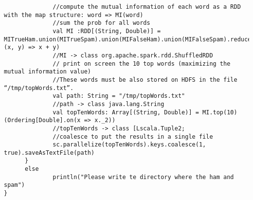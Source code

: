 \documentclass[paper=a4, fontsize=11pt]{scrartcl}
\numberwithin{equation}{section}		%
\numberwithin{figure}{section}			%
\numberwithin{table}{section}				%
\begin{document}
\begin{lstlisting}
              //compute the mutual information of each word as a RDD with the map structure: word => MI(word)
              //sum the prob for all words
              val MI :RDD[(String, Double)] = MITrueHam.union(MITrueSpam).union(MIFalseHam).union(MIFalseSpam).reduceByKey( (x, y) => x + y)
              //MI -> class org.apache.spark.rdd.ShuffledRDD
              // print on screen the 10 top words (maximizing the mutual information value)
              //These words must be also stored on HDFS in the file “/tmp/topWords.txt”.
              val path: String = "/tmp/topWords.txt"
              //path -> class java.lang.String
              val topTenWords: Array[(String, Double)] = MI.top(10)(Ordering[Double].on(x => x._2))
              //topTenWords -> class [Lscala.Tuple2;
              //coalesce to put the results in a single file
              sc.parallelize(topTenWords).keys.coalesce(1, true).saveAsTextFile(path)
      }
      else
              println("Please write te directory where the ham and spam")
}

\end{lstlisting}
\end{document}
